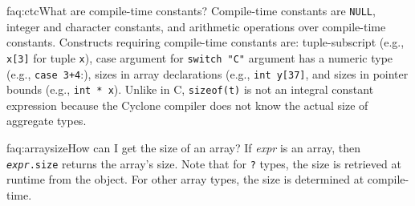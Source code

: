 \begin{faqa}{faq:ctc}{What are compile-time constants?}
Compile-time constants are \texttt{NULL}, integer and character
constants, and arithmetic operations over compile-time constants.
Constructs requiring compile-time constants are: tuple-subscript
(e.g.,
\texttt{x[3]} for tuple \texttt{x}), case argument for 
\texttt{switch "C"} argument has a numeric type (e.g., \texttt{case
  3+4}:), sizes in array declarations (e.g., \texttt{int y[37]}, and
sizes in pointer bounds (e.g., \texttt{int * x\rb}).  Unlike in
C, \texttt{sizeof(t)} is not an integral constant expression because
the Cyclone compiler does not know the actual size of aggregate types.
\end{faqa}

\begin{faqa}{faq:arraysize}{How can I get the size of an array?}
If \textit{expr} is an array, then \texttt{{\it expr}.size} returns
the array's size.  Note that for \texttt{?} types, the size is
retrieved at runtime from the object.  For other array types,
the size is determined at compile-time.
\end{faqa}

